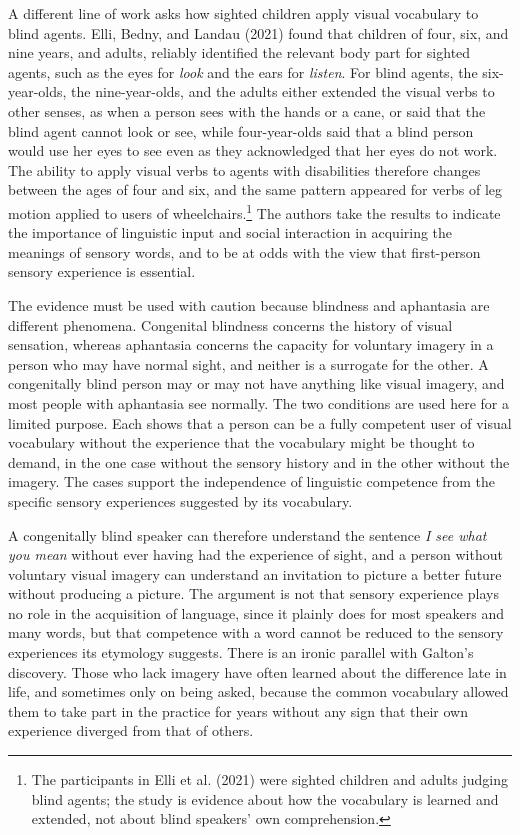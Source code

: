\documentclass[11pt]{article}
\theoremstyle{remark}
\begin{document}
A different line of work asks how sighted children apply visual vocabulary to blind agents. Elli, Bedny, and Landau (2021) found that children of four, six, and nine years, and adults, reliably identified the relevant body part for sighted agents, such as the eyes for \emph{look} and the ears for \emph{listen}. For blind agents, the six-year-olds, the nine-year-olds, and the adults either extended the visual verbs to other senses, as when a person sees with the hands or a cane, or said that the blind agent cannot look or see, while four-year-olds said that a blind person would use her eyes to see even as they acknowledged that her eyes do not work. The ability to apply visual verbs to agents with disabilities therefore changes between the ages of four and six, and the same pattern appeared for verbs of leg motion applied to users of wheelchairs.\footnote{The participants in Elli et al. (2021) were sighted children and adults judging blind agents; the study is evidence about how the vocabulary is learned and extended, not about blind speakers' own comprehension.} The authors take the results to indicate the importance of linguistic input and social interaction in acquiring the meanings of sensory words, and to be at odds with the view that first-person sensory experience is essential.

The evidence must be used with caution because blindness and aphantasia are different phenomena. Congenital blindness concerns the history of visual sensation, whereas aphantasia concerns the capacity for voluntary imagery in a person who may have normal sight, and neither is a surrogate for the other. A congenitally blind person may or may not have anything like visual imagery, and most people with aphantasia see normally. The two conditions are used here for a limited purpose. Each shows that a person can be a fully competent user of visual vocabulary without the experience that the vocabulary might be thought to demand, in the one case without the sensory history and in the other without the imagery. The cases support the independence of linguistic competence from the specific sensory experiences suggested by its vocabulary.

A congenitally blind speaker can therefore understand the sentence \emph{I see what you mean} without ever having had the experience of sight, and a person without voluntary visual imagery can understand an invitation to picture a better future without producing a picture. The argument is not that sensory experience plays no role in the acquisition of language, since it plainly does for most speakers and many words, but that competence with a word cannot be reduced to the sensory experiences its etymology suggests. There is an ironic parallel with Galton's discovery. Those who lack imagery have often learned about the difference late in life, and sometimes only on being asked, because the common vocabulary allowed them to take part in the practice for years without any sign that their own experience diverged from that of others.
\end{document}
